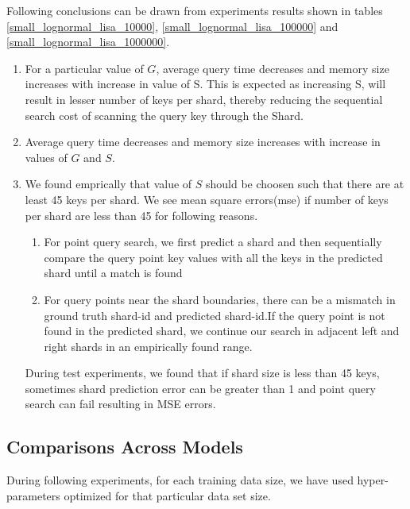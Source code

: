 \begin{mscconclusion}
	Following conclusions can be drawn from experiments results shown in tables \ref{small_lognormal_lisa_10000}, \ref{small_lognormal_lisa_100000} and \ref{small_lognormal_lisa_1000000}. 
\begin{enumerate}

    \item For a particular value of $G$, average query time decreases and memory size increases with increase in value of S. This is expected as increasing S, will result in lesser number of keys per shard, thereby reducing the sequential search cost of scanning the query key through the Shard. 
    
    \item Average query time decreases and memory size increases with increase in values of $G$ and $S$. 
	
	\item We found emprically that value of $S$ should be choosen such that there are at least 45 keys per shard. We see mean square errors(mse) if number of keys per shard are less than 45 for following reasons. 
	\begin{enumerate}
	    \item For point query search, we first predict a shard and then sequentially compare the query point key values with all the keys in the predicted shard until a match is found
		\item For query points near the shard boundaries, there can be a mismatch in ground truth shard-id and predicted shard-id.If the query point is not found in the predicted shard, we continue our search in adjacent left and right shards in an empirically found range.
	\end{enumerate}
	
	During test experiments, we found that if shard size is less than 45 keys, sometimes shard prediction error can be greater than 1 and point query search can fail resulting in MSE errors.  
\end{enumerate}
\end{mscconclusion}

\subsection{Comparisons Across Models}

During following experiments, for each training data size, we have used hyper-parameters optimized for that particular data set size. 


